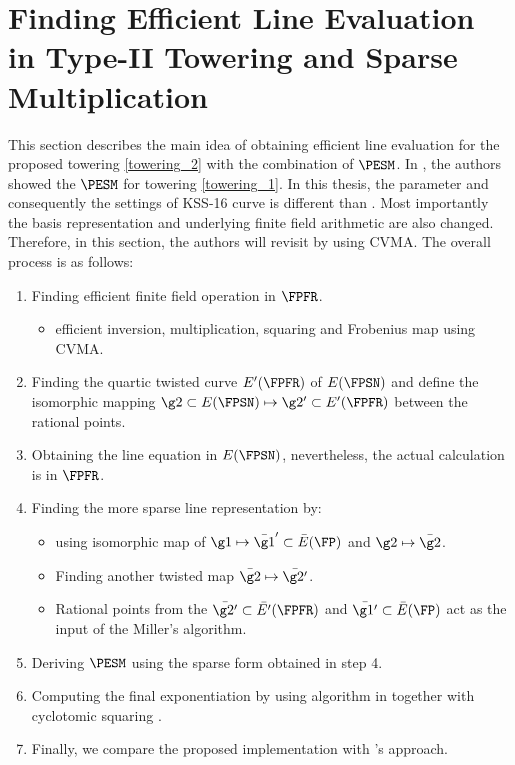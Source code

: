 \section{Finding Efficient Line Evaluation in Type-II Towering and Sparse Multiplication}
\label{sec:3}
This section describes the main idea of obtaining efficient line evaluation for the proposed towering \eqref{towering_2} with the combination of $\PESM$.
In \cite{INDOCRYPT:KNGDNK17}, the authors showed the $\PESM$ for towering \eqref{towering_1}. 
In this thesis, the parameter and consequently the settings of KSS-16 curve is different than \cite{INDOCRYPT:KNGDNK17}. 
Most importantly the basis representation and underlying finite field arithmetic are also changed. 
Therefore, in this section, the authors will revisit \cite{INDOCRYPT:KNGDNK17} by using CVMA.
The overall process is as follows:
\begin{enumerate}
	\item Finding efficient finite field operation in $\FPFR$.
	\begin{itemize}
		\item efficient  inversion, multiplication, squaring and Frobenius map using CVMA.
	\end{itemize}
	\item Finding the quartic twisted curve $E'(\FPFR)$ of $E(\FPSN)$ and define the isomorphic mapping $\g2 \subset E(\FPSN) \mapsto \g2' \subset E'(\FPFR)$ between the rational points.
	\item Obtaining the line equation in $E(\FPSN)$, nevertheless, the actual calculation is in $\FPFR$.
	\item Finding the more sparse line representation by:
		\begin{itemize}
		\item using isomorphic map of $\g1 \mapsto \bar{\g1}' \subset \bar{E}(\FP)$ and $\g2 \mapsto \bar{\g2}$.
		\item Finding another twisted map $\bar{\g2} \mapsto \bar{\g2'}$. 
		\item Rational points from the $\bar{\g2'} \subset \bar{E'}(\FPFR)$  and $\bar{\g1'} \subset \bar{E}(\FP)$ act as the input of the Miller's algorithm.
	\end{itemize}
	\item Deriving $\PESM$ using the sparse form obtained in step 4.
	\item Computing the final exponentiation by using algorithm in \cite{EPRINT:GhaFou16b} together with cyclotomic squaring \cite{PKC:GraSco10}.
	\item  Finally, we compare the proposed implementation with \cite{INDOCRYPT:KNGDNK17}'s approach.
\end{enumerate}
